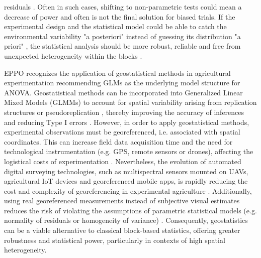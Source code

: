 \documentclass[12pt,a4paper,oneside]{report}
\begin{document}
residuals \cite{schabenbergerStatisticalMethodsSpatial2004,onofriNewMethodAnalysis2010}. 
Often in such cases, 
shifting to non-parametric tests could mean a decrease 
of power \cite{stroupRethinkingAnalysisNonNormal2015,agrestiIntroductionCategoricalData2018}
and often is not the final solution for biased trials.
If the experimental design and the statistical model could be able to catch 
the environmental variability "a posteriori" instead of guessing its distribution "a priori"
\cite{oliverGeostatisticalApplicationsPrecision2010,websterGeostatisticsEnvironmentalScientists2007}, 
the statistical analysis should be more robust, reliable and free from
unexpected heterogeneity within the blocks
\cite{richterGeostatisticalModelsAgricultural2012,lopezEfficiencyIncompleteBlock1995,aquiles_e_effect_2024}.

EPPO recognizes the application of geostatistical methods in agricultural 
experimentation recommending GLMs as the underlying 
model structure for ANOVA.
Geostatistical methods can be incorporated into Generalized Linear Mixed Models 
(GLMMs) to account for spatial variability arising from replication structures 
or pseudoreplication \cite{gburAnalysisGeneralizedLinear2020,kumleEstimatingPowerGeneralized2021}, 
thereby improving the accuracy of inferences and reducing 
Type I errors
\cite{slaets_linear_2021,millar_remedies_2004,Piepho_2011,schabenbergerStatisticalMethodsSpatial2004,aquiles_e_effect_2024}.
However, in order to apply geostatistical methods, experimental observations must 
be georeferenced, i.e. associated with spatial coordinates. This can increase 
field data acquisition time and the need for technological instrumentation 
(e.g. GPS, remote sensors or drones), affecting the logistical costs of 
experimentation \cite{antoniou_chapter_2023,alexopoulos_complementary_2023,zhao_grain_2011}.
Nevertheless, the evolution of automated digital surveying technologies, 
such as multispectral sensors mounted on UAVs, agricultural IoT devices and 
georeferenced mobile apps, is rapidly reducing the cost and complexity of 
georeferencing in experimental agriculture \cite{cisternas_systematic_2020,mondino_considerazioni_2017}.
Additionally, using real georeferenced measurements instead of subjective 
visual estimates reduces the risk of violating the assumptions of parametric 
statistical models (e.g. normality of residuals or homogeneity of variance) 
\cite{stevenson_overview_2001,acutis_perfunctory_2012,chiang_what_2014}.
Consequently, geostatistics can be a viable alternative to classical 
block-based statistics, offering greater robustness and statistical power, 
particularly in contexts of high spatial heterogeneity.
\end{document}
